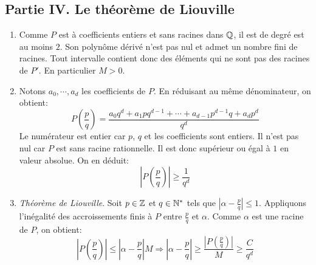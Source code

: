 \subsection*{Partie IV. Le théorème de Liouville}
\begin{enumerate}
\item Comme $P$ est à coefficients entiers et sans racines dans $\mathbb{Q}$, il est de degré est au moins $2$. Son polynôme dérivé n'est pas nul et admet un nombre fini de racines. Tout intervalle contient donc des éléments qui ne sont pas des racines de $P'$. En particulier $M>0$.
\item  Notons $a_0,\cdots,a_d$ les coefficients de $P$. En réduisant au même dénominateur, on obtient:
\begin{displaymath}
 P(\frac{p}{q}) = \frac{a_0q^d + a_1pq^{d-1}+\cdots + a_{d-1}p^{d-1}q+ a_{d}p^{d}}{q^d}
\end{displaymath}
Le numérateur est entier car $p$, $q$ et les coefficients sont entiers. Il n'est pas nul car $P$ est sans racine rationnelle. Il est donc supérieur ou égal à $1$ en valeur absolue. On en déduit:
\begin{displaymath}
 \left|P(\frac{p}{q})\right|\geq \frac{1}{q^d}
\end{displaymath}

\item \emph{Théorème de Liouville}. Soit $p\in\mathbb{Z}$ et $q\in\mathbb{N}^*$ tels que $|\alpha -\frac{p}{q}|\leq 1$. Appliquons l'inégalité des accroissements finis à $P$ entre $\frac{p}{q}$ et $\alpha$. Comme $\alpha$ est une racine de $P$, on obtient:
\begin{displaymath}
 \left|P(\frac{p}{q})\right|\leq \left|\alpha -\frac{p}{q}\right|M
\Rightarrow \left|\alpha -\frac{p}{q}\right| \geq \frac{\left|P(\frac{p}{q})\right|}{M}
\geq \frac{C}{q^d}
\end{displaymath}


\end{enumerate}
